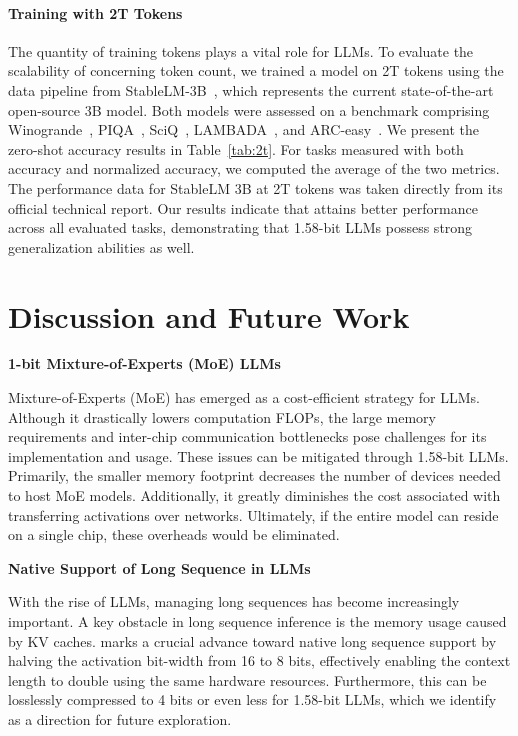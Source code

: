 \paragraph{Training with 2T Tokens}

The quantity of training tokens plays a vital role for LLMs. To evaluate the scalability of  concerning token count, we trained a  model on 2T tokens using the data pipeline from StableLM-3B~\cite{StableLM-3B-4E1T}, which represents the current state-of-the-art open-source 3B model. Both models were assessed on a benchmark comprising Winogrande~\cite{winoGrande}, PIQA~\cite{piqa}, SciQ~\cite{sciq}, LAMBADA~\cite{lambada}, and ARC-easy~\cite{arc}. We present the zero-shot accuracy results in Table~\ref{tab:2t}. For tasks measured with both accuracy and normalized accuracy, we computed the average of the two metrics. The performance data for StableLM 3B at 2T tokens was taken directly from its official technical report. Our results indicate that  attains better performance across all evaluated tasks, demonstrating that 1.58-bit LLMs possess strong generalization abilities as well.

\section{Discussion and Future Work}

\textbf{1-bit Mixture-of-Experts (MoE) LLMs}

Mixture-of-Experts (MoE) has emerged as a cost-efficient strategy for LLMs. Although it drastically lowers computation FLOPs, the large memory requirements and inter-chip communication bottlenecks pose challenges for its implementation and usage. These issues can be mitigated through 1.58-bit LLMs. Primarily, the smaller memory footprint decreases the number of devices needed to host MoE models. Additionally, it greatly diminishes the cost associated with transferring activations over networks. Ultimately, if the entire model can reside on a single chip, these overheads would be eliminated.

\textbf{Native Support of Long Sequence in LLMs}

With the rise of LLMs, managing long sequences has become increasingly important. A key obstacle in long sequence inference is the memory usage caused by KV caches.  marks a crucial advance toward native long sequence support by halving the activation bit-width from 16 to 8 bits, effectively enabling the context length to double using the same hardware resources. Furthermore, this can be losslessly compressed to 4 bits or even less for 1.58-bit LLMs, which we identify as a direction for future exploration.


